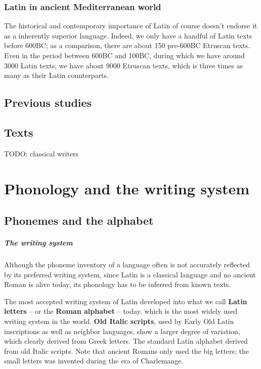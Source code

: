 \documentclass[a4paper, oneside, 12pt]{report}
\newcommand*{\concept}[1]{\textbf{#1}}
\begin{document}
\subsection{Latin in ancient Mediterranean world}

The historical and contemporary importance of Latin 
of course doesn't endorse it as a inherently superior language. 
Indeed, we only have a handful of Latin texts before 600BC; 
as a comparison, there are about 150 pre-600BC Etruscan texts.
Even in the period between 600BC and 100BC, 
during which we have around 3000 Latin texts,
we have about 9000 Etruscan texts, 
which is three times as many as their Latin counterparts. 


\section{Previous studies}


\section{Texts}

TODO: classical writers

\chapter{Phonology and the writing system}

\section{Phonemes and the alphabet}

\paragraph*{The writing system}
Although the phoneme inventory of a language 
often is not accurately reflected by its preferred writing system, 
since Latin is a classical language 
and no ancient Roman is alive today, 
its phonology has to be inferred from known texts. 

The most accepted writing system of Latin developed into 
what we call \concept{Latin letters} -- or the \concept{Roman alphabet} -- today, 
which is the most widely used writing system in the world.
\concept{Old Italic scripts},
used by Early Old Latin inscriptions 
as well as neighbor languages,
show a larger degree of variation, 
which clearly derived from Greek letters.
The standard Latin alphabet derived from old Italic scripts.
Note that ancient Romans only used the big letters;
the small letters was invented during the era of Charlemange.
\end{document}
